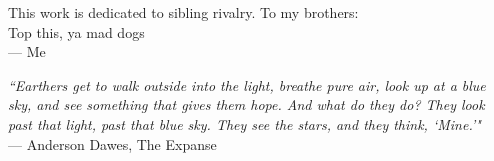 \thispagestyle{empty}
\begin{center}
    \vspace*{5cm}

    This work is dedicated to sibling rivalry. To my brothers: \\
    Top this, ya mad dogs \\
    \vspace{0.5cm} --- Me
    
\end{center}
\newpage

\thispagestyle{empty}
\begin{center}
    \vspace*{5cm}




    \emph{“Earthers get to walk outside into the light, breathe pure air, look up at a blue sky, and see something that gives them hope. And what do they do? They look past that light, past that blue sky. They see the stars, and they think, `Mine.'"} \\
    \vspace{0.5cm}--- Anderson Dawes, The Expanse
    
\end{center}